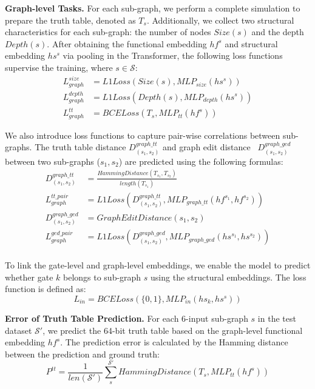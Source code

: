 \noindent\textbf{Graph-level Tasks.}
For each sub-graph, we perform a complete simulation to prepare the truth table, denoted as $T_s$. Additionally, we collect two structural characteristics for each sub-graph: the number of nodes $Size(s)$ and the depth $Depth(s)$. After obtaining the functional embedding $hf^s$ and structural embedding $hs^s$ via pooling in the Transformer, the following loss functions supervise the training, where $s \in \mathcal{S}$:
\begin{equation} \label{Eq:loss:graph}
    \begin{split}
        L_{graph}^{size} & = L1Loss(Size(s), MLP_{size}(hs^s)) \\ 
        L_{graph}^{depth} & = L1Loss(Depth(s), MLP_{depth}(hs^s)) \\ 
        L_{graph}^{tt} & = BCELoss(T_s, MLP_{tt}(hf^s)) 
    \end{split}
\end{equation}

We also introduce loss functions to capture pair-wise correlations between sub-graphs. The truth table distance $D_{(s_1, s_2)}^{graph\_tt}$ and graph edit distance~\citep{bunke1997relation} $D_{(s_1, s_2)}^{graph\_ged}$ between two sub-graphs ($s_1, s_2$) are predicted using the following formulas:
\begin{equation} \label{Eq:loss:graphpair}
    \begin{split}
        D_{(s_1, s_2)}^{graph\_tt} & = \frac{HammingDistance(T_{s_1}, T_{s_2})}{length(T_{s_1})} \\
        L_{graph}^{tt\_pair} & = L1Loss(D_{(s_1, s_2)}^{graph\_tt}, MLP_{graph\_tt}(hf^{s_1}, hf^{s_2})) \\ 
        D_{(s_1, s_2)}^{graph\_ged} & = GraphEditDistance(s_1, s_2) \\ 
        L_{graph}^{ged\_pair} & = L1Loss(D_{(s_1, s_2)}^{graph\_ged}, MLP_{graph\_ged}(hs^{s_1}, hs^{s_2})) \\
    \end{split}
\end{equation}

To link the gate-level and graph-level embeddings, we enable the model to predict whether gate $k$ belongs to sub-graph $s$ using the structural embeddings. The loss function is defined as:
\begin{equation} \label{Eq:loss:in}
    L_{in} = BCELoss(\{0, 1\}, MLP_{in}(hs_k, hs^{s}))
\end{equation}

\noindent\textbf{Error of Truth Table Prediction.}
For each 6-input sub-graph $s$ in the test dataset $\mathcal{S'}$, we predict the 64-bit truth table based on the graph-level functional embedding $hf^s$. The prediction error is calculated by the Hamming distance between the prediction and ground truth:
\begin{equation}
    P^{tt} = \frac{1}{len(\mathcal{S'})} \sum_{s}^{\mathcal{S'}} HammingDistance(T_s, MLP_{tt}(hf^s))
\end{equation}

